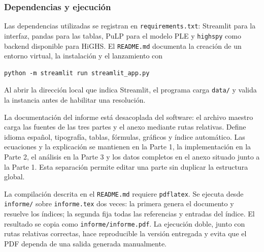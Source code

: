 \subsubsection{Dependencias y ejecución}

Las dependencias utilizadas se registran en \texttt{requirements.txt}: Streamlit
para la interfaz, pandas para las tablas, PuLP para el modelo PLE y \texttt{highspy}
como backend disponible para HiGHS. El \texttt{README.md} documenta la creación
de un entorno virtual, la instalación y el lanzamiento con
\begin{verbatim}
python -m streamlit run streamlit_app.py
\end{verbatim}
Al abrir la dirección local
que indica Streamlit, el programa carga \texttt{data/} y valida la instancia
antes de habilitar una resolución.

La documentación del informe está desacoplada del software: el archivo maestro
carga las fuentes de las tres partes y el anexo mediante rutas relativas.
Define idioma español, tipografía, tablas, fórmulas, gráficos y índice
automático. Las ecuaciones y la explicación se mantienen
en la Parte 1, la implementación en la Parte 2, el análisis en la Parte 3 y
los datos completos en el anexo situado junto a la Parte 1. Esta separación
permite editar una parte sin duplicar la estructura global.

La compilación descrita en el \texttt{README.md} requiere \texttt{pdflatex}.
Se ejecuta desde \texttt{informe/} sobre \texttt{informe.tex} dos veces: la
primera genera el documento y resuelve los índices; la segunda fija todas las
referencias y entradas del índice. El resultado se copia como
\texttt{informe/informe.pdf}. La ejecución doble, junto con rutas relativas
correctas, hace reproducible la versión entregada y evita que el PDF dependa
de una salida generada manualmente.
